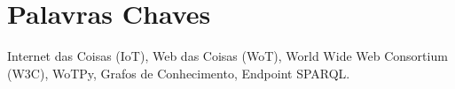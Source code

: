 \chapter{Palavras Chaves}


Internet das Coisas (IoT), Web das Coisas (WoT), World Wide Web Consortium (W3C), WoTPy, Grafos de Conhecimento, Endpoint SPARQL.

